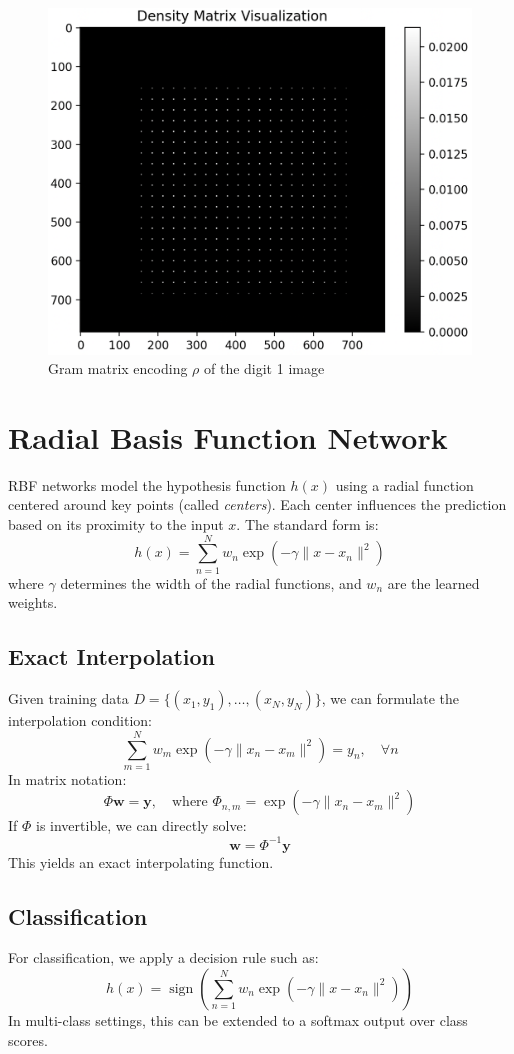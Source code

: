 \begin{figure}[h!]
    \centering
    \includegraphics[width=0.6\linewidth]{figures/density_matrix_nmist_one.png}
    \caption{Gram matrix encoding $\rho$ of the digit 1 image}
    \label{fig:density_matrix}
\end{figure}

\section{Radial Basis Function Network}

RBF networks model the hypothesis function $h(x)$ using a radial function centered around key points (called \emph{centers}). Each center influences the prediction based on its proximity to the input $x$. The standard form is:
\[
h(x) = \sum_{n=1}^N w_n\exp\left(-\gamma\| x - x_n \|^2\right)
\]
where $\gamma$ determines the width of the radial functions, and $w_n$ are the learned weights.

\subsection{Exact Interpolation}
Given training data $D = \{(x_1, y_1), \dots, (x_N, y_N)\}$, we can formulate the interpolation condition:
\[
\sum_{m=1}^N w_m\exp\left(-\gamma\| x_n - x_m \|^2\right) = y_n, \quad \forall n
\]
In matrix notation:
\[
\Phi \mathbf{w} = \mathbf{y}, \quad \text{where } \Phi_{n,m} = \exp\left(-\gamma\|x_n - x_m\|^2\right)
\]
If $\Phi$ is invertible, we can directly solve:
\[
\mathbf{w} = \Phi^{-1} \mathbf{y}
\]
This yields an exact interpolating function.

\subsection{Classification}
For classification, we apply a decision rule such as:
\[
h(x) = \operatorname{sign}\left(\sum_{n=1}^N w_n\exp(-\gamma\|x - x_n\|^2)\right)
\]
In multi-class settings, this can be extended to a softmax output over class scores.

